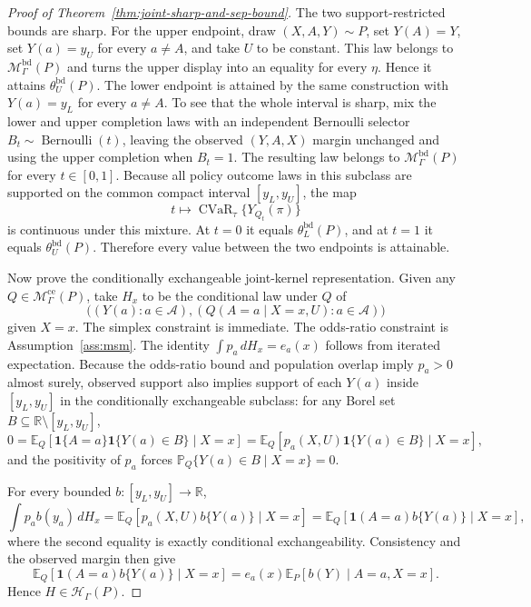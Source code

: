 \documentclass[11pt]{article}
\newcommand{\E}{\mathbb{E}}
\renewcommand{\Pr}{\mathbb{P}}
\newcommand{\one}{\mathbf{1}}
\newcommand{\calH}{\mathcal{H}}
\newcommand{\R}{\mathbb{R}}
\theoremstyle{definition}
\theoremstyle{plain}
\theoremstyle{remark}
\begin{document}
\begin{proof}[Proof of Theorem~\ref{thm:joint-sharp-and-sep-bound}]
The two support-restricted bounds are sharp.  For the upper endpoint, draw
\((X,A,Y)\sim P\), set \(Y(A)=Y\), set \(Y(a)=y_U\) for every \(a\ne A\), and
take \(U\) to be constant.  This law belongs to
\(\mathcal M_\Gamma^{\mathrm{bd}}(P)\) and turns the upper display into an
equality for every \(\eta\).  Hence it attains
\(\theta_U^{\mathrm{bd}}(P)\).  The lower endpoint is attained by the same
construction with \(Y(a)=y_L\) for every \(a\ne A\).  To see that the whole
interval is sharp, mix the lower and upper completion laws with an independent
Bernoulli selector \(B_t\sim\operatorname{Bernoulli}(t)\), leaving the observed
\((Y,A,X)\) margin unchanged and using the upper completion when \(B_t=1\).  The
resulting law belongs to \(\mathcal M_\Gamma^{\mathrm{bd}}(P)\) for every
\(t\in[0,1]\).  Because all policy outcome laws in this subclass are supported
on the common compact interval \([y_L,y_U]\), the map
\[
t\mapsto \operatorname{CVaR}_\tau\{Y_{Q_t}(\pi)\}
\]
is continuous under this mixture.  At \(t=0\) it equals
\(\theta_L^{\mathrm{bd}}(P)\), and at \(t=1\) it equals
\(\theta_U^{\mathrm{bd}}(P)\).  Therefore every value between the two endpoints
is attainable.

Now prove the conditionally exchangeable joint-kernel representation.  Given
any \(Q\in\mathcal M_\Gamma^{\mathrm{ce}}(P)\), take \(H_x\) to be the
conditional law under \(Q\) of
\[
\bigl((Y(a):a\in\mathcal A),(Q(A=a\mid X=x,U):a\in\mathcal A)\bigr)
\]
given \(X=x\).  The simplex constraint is immediate.  The odds-ratio constraint
is Assumption~\ref{ass:msm}.  The identity
\(\int p_a\,dH_x=e_a(x)\) follows from iterated expectation.  Because the
odds-ratio bound and population overlap imply \(p_a>0\) almost surely, observed
support also implies support of each \(Y(a)\) inside \([y_L,y_U]\) in the
conditionally exchangeable subclass: for any Borel set
\(B\subseteq\R\setminus[y_L,y_U]\),
\[
0
=
\E_Q[\one\{A=a\}\one\{Y(a)\in B\}\mid X=x]
=
\E_Q[p_a(X,U)\one\{Y(a)\in B\}\mid X=x],
\]
and the positivity of \(p_a\) forces
\(\Pr_Q\{Y(a)\in B\mid X=x\}=0\).

For every bounded \(b:[y_L,y_U]\to\R\),
\[
\int p_a b(y_a)\,dH_x
=
\E_Q[p_a(X,U)b\{Y(a)\}\mid X=x]
=
\E_Q[\one(A=a)b\{Y(a)\}\mid X=x],
\]
where the second equality is exactly conditional exchangeability.  Consistency
and the observed margin then give
\[
\E_Q[\one(A=a)b\{Y(a)\}\mid X=x]
=
e_a(x)\E_P[b(Y)\mid A=a,X=x].
\]
Hence \(H\in\calH_\Gamma(P)\).


\end{proof}
\end{document}
